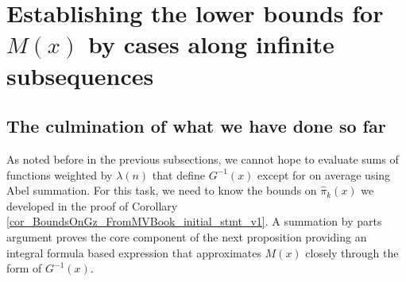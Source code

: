 \documentclass[11pt,reqno,a4letter]{article}
\numberwithin{figure}{section}
\numberwithin{table}{section}
\theoremstyle{plain}
\numberwithin{theorem}{section}
\theoremstyle{definition}
\begin{document}
\newpage
\section{Establishing the lower bounds for $M(x)$ by cases along infinite subsequences} 
\label{Section_KeyApplications} 

\subsection{The culmination of what we have done so far} 

As noted before in the previous subsections, we cannot hope to evaluate sums of 
functions weighted by $\lambda(n)$ that define $G^{-1}(x)$ except for on 
average using Abel summation. For this task, 
we need to know the bounds on $\widehat{\pi}_k(x)$ we developed in the 
proof of Corollary \ref{cor_BoundsOnGz_FromMVBook_initial_stmt_v1}. 
A summation by parts argument proves the core component of the next proposition providing an 
integral formula based expression that approximates $M(x)$ closely 
through the form of $G^{-1}(x)$. 
\end{document}
